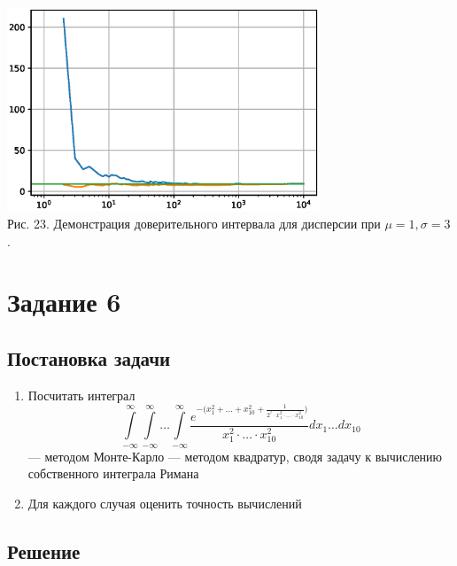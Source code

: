 \documentclass[11pt]{article}
\begin{document}
\begin{center}
	\includegraphics[width=0.7\textwidth]{5_5.eps}\\
	{Рис. 23. Демонстрация доверительного интервала для дисперсии при $\mu = 1, \sigma = 3$. }
\end{center}

\newpage
\section{Задание 6}
\subsection{Постановка задачи}
\begin{enumerate}
	\item Посчитать интеграл		
	\[ \int\limits_{-\infty}^\infty \int\limits_{-\infty}^\infty\dots  \int\limits_{-\infty}^\infty \frac{e^{-\bigg(x_1^2 + \dots + x_{10}^2 + \frac{1}{2^7\cdot x_1^2 \cdot \dots \cdot x_{10}^2}\bigg)}}{x_1^2 \cdot \dots \cdot x_{10}^2}dx_1\dots dx_{10} \] 
	--- методом Монте-Карло 
	\newline
	--- методом квадратур, сводя задачу к вычислению собственного интеграла Римана
	\item Для каждого случая оценить точность вычислений
\end{enumerate}
\subsection{Решение}
\end{document}
